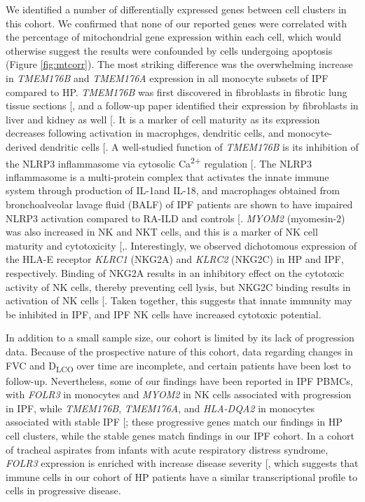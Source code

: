 \documentclass[
]{article}
\begin{document}
We identified a number of differentially expressed genes between cell clusters in this cohort. We confirmed that none of our reported genes were correlated with the percentage of mitochondrial gene expression within each cell, which would otherwise suggest the results were confounded by cells undergoing apoptosis (Figure \ref{fig:mtcorr}). The most striking difference was the overwhelming increase in \textit{TMEM176B} and \textit{TMEM176A} expression in all monocyte subsets of IPF compared to HP. \textit{TMEM176B} was first discovered in fibroblasts in fibrotic lung tissue sections {[}\citeproc{ref-lurton_isolation_1999}{174}{]}, and a follow-up paper identified their expression by fibroblasts in liver and kidney as well {[}\citeproc{ref-etikala_lr8_2017}{175}{]}. It is a marker of cell maturity as its expression decreases following activation in macrophges, dendritic cells, and monocyte-derived dendritic cells {[}\citeproc{ref-louvet_identification_2005}{176}{]}. A well-studied function of \textit{TMEM176B} is its inhibition of the NLRP3 inflammasome via cytosolic Ca\textsuperscript{2+} regulation {[}\citeproc{ref-segovia_targeting_2019}{177}{]}. The NLRP3 inflammasome is a multi-protein complex that activates the innate immune system through production of IL-1\beta and IL-18, and macrophages obtained from bronchoalveolar lavage fluid (BALF) of IPF patients are shown to have impaired NLRP3 activation compared to RA-ILD and controls {[}\citeproc{ref-lasithiotaki_nlrp3_2016}{178}{]}. \textit{MYOM2} (myomesin-2) was also increased in NK and NKT cells, and this is a marker of NK cell maturity and cytotoxicity {[},\citeproc{ref-cai_single-cell_2020}{180}{]}. Interestingly, we observed dichotomous expression of the HLA-E receptor \textit{KLRC1} (NKG2A) and \textit{KLRC2} (NKG2C) in HP and IPF, respectively. Binding of NKG2A results in an inhibitory effect on the cytotoxic activity of NK cells, thereby preventing cell lysis, but NKG2C binding results in activation of NK cells {[}\citeproc{ref-braud_hla-e_1998}{181}{]}. Taken together, this suggests that innate immunity may be inhibited in IPF, and IPF NK cells have increased cytotoxic potential.

In addition to a small sample size, our cohort is limited by its lack of progression data. Because of the prospective nature of this cohort, data regarding changes in FVC and D\textsubscript{LCO} over time are incomplete, and certain patients have been lost to follow-up. Nevertheless, some of our findings have been reported in IPF PBMCs, with \textit{FOLR3} in monocytes and \textit{MYOM2} in NK cells associated with progression in IPF, while \textit{TMEM176B}, \textit{TMEM176A}, and \textit{HLA-DQA2} in monocytes associated with stable IPF {[}\citeproc{ref-unterman_single-cell_2024}{167}{]}; these progressive genes match our findings in HP cell clusters, while the stable genes match findings in our IPF cohort. In a cohort of tracheal aspirates from infants with acute respiratory distress syndrome, \textit{FOLR3} expression is enriched with increase disease severity {[}\citeproc{ref-flerlage_single_2023}{182}{]}, which suggests that immune cells in our cohort of HP patients have a similar transcriptional profile to cells in progressive disease.
\end{document}
